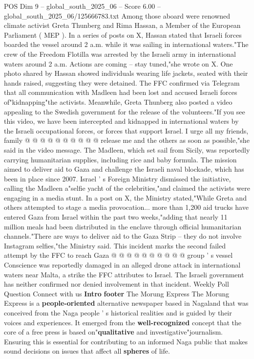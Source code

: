 \begin{textsample}{POS Dim 9 – global\_south\_2025\_06 – Score 6.00 – global\_south\_2025\_06/125666783.txt}  \label{ex:f9_pos_173}
Among those aboard were renowned climate activist Greta Thunberg and Rima Hassan, a Member of the European Parliament ( MEP ).
In a series of posts on X, Hassan stated that Israeli forces boarded the vessel around 2 a.m. while it was sailing in international waters."The crew of the Freedom Flotilla was arrested by the Israeli army in international waters around 2 a.m.
Actions are coming -- stay tuned,"she wrote on X.
One photo shared by Hassan showed individuals wearing life jackets, seated with their hands raised, suggesting they were detained.
The FFC confirmed via Telegram that all communication with Madleen had been lost and accused Israeli forces of"kidnapping"the activists.
Meanwhile, Greta Thunberg also posted a video appealing to the Swedish government for the release of the volunteers."If you see this video, we have been intercepted and kidnapped in international waters by the Israeli occupational forces, or forces that support Israel.
I urge all my friends, family @ @ @ @ @ @ @ @ @ @ release me and the others as soon as possible,"she said in the video message.
The Madleen, which set sail from Sicily, was reportedly carrying humanitarian supplies, including rice and baby formula.
The mission aimed to deliver aid to Gaza and challenge the Israeli naval blockade, which has been in place since 2007.
Israel ' s Foreign Ministry dismissed the initiative, calling the Madleen a"selfie yacht of the celebrities,"and claimed the activists were engaging in a media stunt.
In a post on X, the Ministry stated,"While Greta and others attempted to stage a media provocation... more than 1,200 aid trucks have entered Gaza from Israel within the past two weeks,"adding that nearly 11 million meals had been distributed in the enclave through official humanitarian channels."There are ways to deliver aid to the Gaza Strip -- they do not involve Instagram selfies,"the Ministry said.
This incident marks the second failed attempt by the FFC to reach Gaza @ @ @ @ @ @ @ @ @ @ group ' s vessel Conscience was reportedly damaged in an alleged drone attack in international waters near Malta, a strike the FFC attributes to Israel.
The Israeli government has neither confirmed nor denied involvement in that incident.
Weekly Poll Question Connect with us \textbf{Intro} \textbf{footer} The Morung Express The Morung Express is a \textbf{people-oriented} alternative newspaper based in Nagaland that was conceived from the Naga people ' s historical realities and is guided by their voices and experiences.
It emerged from the \textbf{well-recognized} concept that the core of a free press is based on"\textbf{qualitative} and investigative"journalism.
Ensuring this is essential for contributing to an informed Naga public that makes sound decisions on issues that affect all \textbf{spheres} of life.

\end{textsample}
